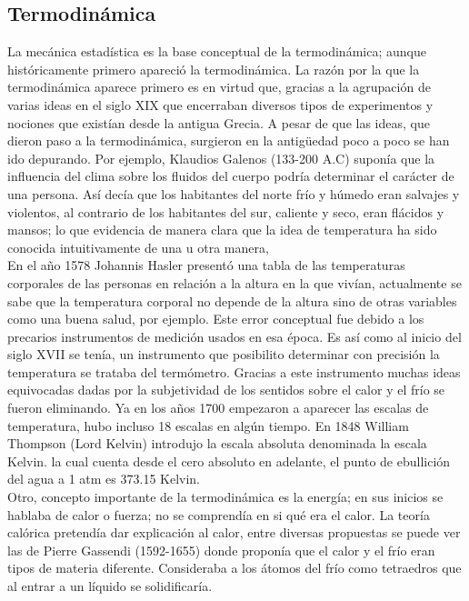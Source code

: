 \subsection{Termodinámica}
La mecánica estadística es la base conceptual de la termodinámica; aunque históricamente primero apareció la termodinámica. La razón por la que la termodinámica aparece primero es en virtud que, gracias a la agrupación de varias ideas en el siglo XIX que encerraban diversos tipos de experimentos y nociones que existían desde la antigua Grecia. A pesar de que las ideas, que dieron paso a la termodinámica, surgieron en la antigüedad poco a poco se han ido depurando. Por ejemplo, Klaudios Galenos (133-200 A.C) suponía que la influencia del clima sobre los fluidos del cuerpo podría determinar el carácter de una persona. Así decía que los habitantes del norte frío y húmedo eran salvajes y violentos, al contrario de los habitantes del sur, caliente y seco, eran flácidos y mansos; lo que evidencia de manera clara que la idea de temperatura ha sido conocida intuitivamente de una u otra manera, 
\\
En el año 1578 Johannis Hasler presentó una tabla de las temperaturas corporales de las personas en relación a la altura en la que vivían, actualmente se sabe que la temperatura corporal no depende de la altura sino de otras variables como una buena salud, por ejemplo. Este error conceptual fue debido a los precarios instrumentos de medición usados en esa época. Es así como al inicio del siglo XVII se tenía, un instrumento que posibilito determinar con precisión la temperatura se trataba del termómetro. Gracias a este instrumento muchas ideas equivocadas dadas por la subjetividad de los sentidos sobre el calor y el frío se fueron eliminando. Ya en los años 1700 empezaron a aparecer las escalas de temperatura, hubo incluso 18 escalas en algún tiempo. En 1848 William Thompson (Lord Kelvin) introdujo la escala absoluta denominada la escala Kelvin. la cual cuenta desde el cero absoluto en adelante, el punto de ebullición del agua a 1 atm es 373.15 Kelvin.
\\
Otro, concepto importante de la termodinámica es la energía; en sus inicios se hablaba  de  calor o fuerza; no se comprendía en si qué era el calor. La teoría calórica pretendía dar explicación al calor, entre diversas propuestas se puede ver las de Pierre Gassendi (1592-1655) donde proponía que el calor y el frío eran tipos de materia diferente. Consideraba a los átomos del frío como tetraedros que al entrar a un líquido se solidificaría.
\\
